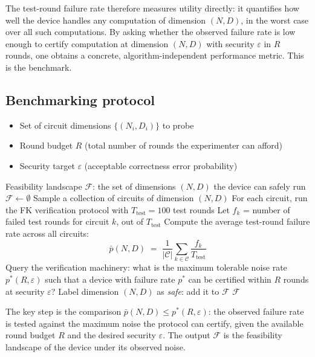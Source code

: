 \documentclass[]{article}
\begin{document}
The test-round failure rate therefore measures utility directly: it quantifies
how well the device handles any computation of dimension $(N, D)$, in the
worst case over all such computations. By asking whether the observed failure
rate is low enough to certify computation at dimension $(N, D)$ with security
$\varepsilon$ in $R$ rounds, one obtains a concrete, algorithm-independent
performance metric. This is the benchmark.

\subsection{Benchmarking protocol}
\label{subsec:bench-protocol}

\begin{algorithm}[H]
\caption{Verification-based feasibility benchmark}
\begin{algorithmic}[1]
\Require
  \begin{itemize}
    \item Set of circuit dimensions $\{(N_i, D_i)\}$ to probe
    \item Round budget $R$ (total number of rounds the experimenter can afford)
    \item Security target $\varepsilon$ (acceptable correctness error probability)
  \end{itemize}
\Ensure Feasibility landscape $\mathcal{F}$: the set of dimensions $(N, D)$ the device can safely run
\State $\mathcal{F} \leftarrow \emptyset$
    \State Sample a collection of circuits of dimension $(N, D)$
    \State For each circuit, run the FK verification protocol with $T_{\mathrm{test}} = 100$ test rounds
    \State Let $f_k$ = number of failed test rounds for circuit $k$, out of $T_{\mathrm{test}}$
    \State Compute the average test-round failure rate across all circuits:
    \[
        \bar{p}(N, D) \;=\; \frac{1}{|\mathcal{C}|}\sum_{k \in \mathcal{C}} \frac{f_k}{T_{\mathrm{test}}}
    \]
    \State Query the verification machinery: what is the maximum tolerable noise rate $p^*(R, \varepsilon)$
           such that a device with failure rate $p^*$ can be certified within $R$ rounds at security $\varepsilon$?
        \State Label dimension $(N, D)$ as \emph{safe}: add it to $\mathcal{F}$
    \EndIf
\EndFor
\State \Return $\mathcal{F}$
\end{algorithmic}
\end{algorithm}

The key step is the comparison $\bar{p}(N,D) \leq p^*(R, \varepsilon)$: the observed failure
rate is tested against the maximum noise the protocol can certify, given the available round
budget $R$ and the desired security $\varepsilon$. The output $\mathcal{F}$ is the feasibility
landscape of the device under its observed noise.
\end{document}
